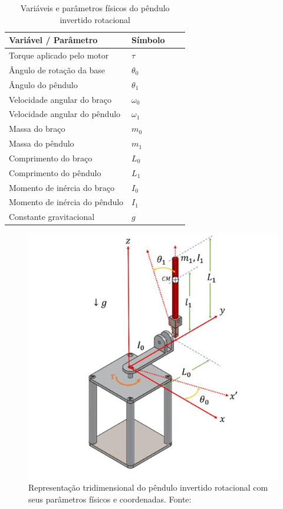 \documentclass[9pt,a4paper,twocolumn,twoside]{tau-class/tau}
\begin{document}
    \begin{table}[H]
        \centering
        \caption{Variáveis e parâmetros físicos do pêndulo invertido rotacional}
        \begin{tabular}{llll}
            \toprule
            \textbf{Variável / Parâmetro} & \textbf{Símbolo} \\
            \midrule
            Torque aplicado pelo motor  &  $\tau$ \\
            Ângulo de rotação da base  &  $\theta_0$ \\
            Ângulo do pêndulo  &  $\theta_1$ \\
            Velocidade angular do braço  &  $\omega_0$ \\
            Velocidade angular do pêndulo  &  $\omega_1$ \\
            Massa do braço  &  $m_0$ \\
            Massa do pêndulo  &  $m_1$ \\
            Comprimento do braço  &  $L_0$ \\
            Comprimento do pêndulo  &  $L_1$ \\
            Momento de inércia do braço  &  $I_0$ \\
            Momento de inércia do pêndulo  &  $I_1$ \\
            Constante gravitacional  &  $g$ \\
            \bottomrule
        \end{tabular}
    \end{table}

\begin{figure}[H]
        \centering
        \includegraphics[width=0.85\columnwidth]{figures/pendulo com angulos.png}
        \caption{Representação tridimensional do pêndulo invertido rotacional com seus parâmetros físicos e coordenadas. Fonte: \cite{Duart2017}}
        \label{fig:esquema}
\end{figure} 
\end{document}
